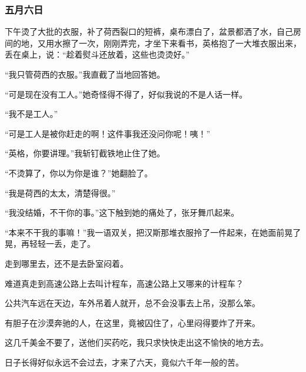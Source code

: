 \subsubsection{五月六日}
\par 下午烫了大批的衣服，补了荷西裂口的短裤，桌布漂白了，盆景都洒了水，自己房间的地，又用水擦了一次，刚刚弄完，才坐下来看书，英格抱了一大堆衣服出来，丢在桌上，说：“趁着熨斗还放着，这些也烫烫好。”
\par “我只管荷西的衣服。”我直截了当地回答她。
\par “可是现在没有工人。”她奇怪得不得了，好似我说的不是人话一样。
\par “我不是工人。”
\par “可是工人是被你赶走的啊！这件事我还没问你呢！咦！”
\par “英格，你要讲理。”我斩钉截铁地止住了她。
\par “不烫算了，你以为你是谁？”她翻脸了。
\par “我是荷西的太太，清楚得很。”
\par “我没结婚，不干你的事。”这下触到她的痛处了，张牙舞爪起来。
\par “本来不干我的事嘛！”我一语双关，把汉斯那堆衣服拎了一件起来，在她面前晃了晃，再轻轻一丢，走了。
\par 走到哪里去，还不是去卧室闷着。
\par 难道真走到高速公路上去叫计程车，高速公路上又哪来的计程车？
\par 公共汽车远在天边，车外吊着人就开，总不会没事去上吊，没那么笨。
\par 有胆子在沙漠奔驰的人，在这里，竟被囚住了，心里闷得要炸了开来。
\par 这几千美金不要了，送他们买药吃，我只求快快走出这不愉快的地方去。
\par 日子长得好似永远不会过去，才来了六天，竟似六千年一般的苦。


